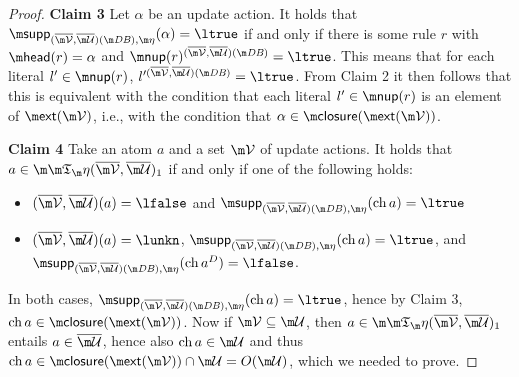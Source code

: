 \begin{proof}
\textbf{Claim 3} 
Let $\alpha$ be an update action. 
It holds that  $\supp_{(\overline\VV,\overline\UU)(\db),\aics}(\alpha) = \ltrue$ if and only if there is some rule $r$ with $\head(r)=\alpha$ and $\nup(r)^{ (\overline\VV, \overline\UU)(\db)} = \ltrue$. This means that for each literal $l'\in \nup(r)$, $l'^{(\overline\VV, \overline\UU)(\db)} = \ltrue$. From Claim 2 it then follows that this is equivalent with the condition that each literal $l'\in\nup(r)$ is an element of   $\ext(\VV)$, i.e., with  the condition that $\alpha \in \closure(\ext(\VV))$. 


\textbf{Claim 4}
Take an atom $a$ and a set $\VV$ of update actions. It holds that $a\in \Ap(\overline\VV,\overline\UU)_1$ if and only if one of the following holds:
\begin{itemize}
 \item $(\overline \VV,\overline \UU)(a) = \lfalse$ and $\supp_{(\overline\VV,\overline\UU)(\db),\aics}(\change a)=\ltrue$
 \item $(\overline \VV,\overline \UU)(a) = \lunkn$, $ \supp_{(\overline\VV,\overline\UU)(\db),\aics}(\change a)=\ltrue$, and $\supp_{(\overline\VV,\overline\UU)(\db),\aics}(\change a^D) = \lfalse$.
\end{itemize}
In both cases, $\supp_{(\overline\VV,\overline\UU)(\db),\aics}(\change a)=\ltrue$, hence by Claim 3, $\change a\in \closure(\ext(\VV))$. Now if $\VV\subseteq \UU$, then $a\in\Ap(\overline\VV,\overline\UU)_1$ entails $a\in \overline\UU$, hence also $\change a \in \UU$ and thus $\change a \in \closure(\ext(\VV)) \cap \UU = O(\UU)$, which we needed to prove. \qedhere





\end{proof}
